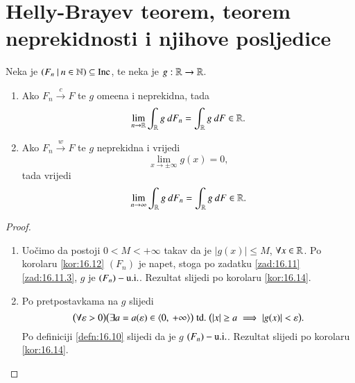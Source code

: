 
\chapter{Helly-Brayev teorem, teorem neprekidnosti i njihove posljedice}

\begin{tm}  \label{tm:18.1}
    Neka je $({F_n} \: | \: {n \in \mathbb{N}}) \subseteq \mathrm{Inc}$, te neka je $g: \mathbb{R} \to \mathbb{R}$.
    \begin{enumerate}[label=(\roman*)]
        \item   \label{tm:18.1.1}
        Ako $F_n \xrightarrow{c} F$ te $g$ ome\dj ena i neprekidna, tada
        \begin{equation*}
            \lim\limits_{n \to \mathbb{R}} \int_{\mathbb{R}} g \: d F_n = \int_{\mathbb{R}} g \: d F \in \mathbb{R}.
        \end{equation*}
        \item   \label{tm:18.1.2}
        Ako $F_n \xrightarrow{w} F$ te $g$ neprekidna i vrijedi
        \begin{equation*}
            \lim\limits_{x \to \pm \infty} g (x) = 0,    
        \end{equation*}
        tada vrijedi
        \begin{equation*}
            \lim\limits_{n \to \infty} \int_{\mathbb{R}} g \: d F_n = \int_{\mathbb{R}} g \: d F \in \mathbb{R}.
        \end{equation*}
    \end{enumerate}
\end{tm}

\begin{proof}
    \begin{enumerate}[label=(\roman*)]
        \item
        Uo\v cimo da postoji $0<M<+\infty$ takav da je $|g(x)| \leq M$, $\forall x \in \mathbb{R}$.
        Po korolaru \ref{kor:16.12} $(F_n)$ je napet, stoga po zadatku \ref{zad:16.11} \ref{zad:16.11.3}, $g$ je $(F_n)-\mathrm{u.i.}$.
        Rezultat slijedi po korolaru \ref{kor:16.14}.
        \item
        Po pretpostavkama na $g$ slijedi
        \begin{equation*}
            \big(\forall \varepsilon > 0\big) \big(\exists a = a (\varepsilon) \in \langle {0}, \: {+\infty} \rangle\big) \; \mathrm{td.} \; \big(|x| \geq a \implies |g(x)| < \varepsilon \big).
        \end{equation*}
        Po definiciji \ref{defn:16.10} slijedi da je $g$ $(F_n)-\mathrm{u.i.}$.
        Rezultat slijedi po korolaru \ref{kor:16.14}.
    \end{enumerate}
\end{proof}

